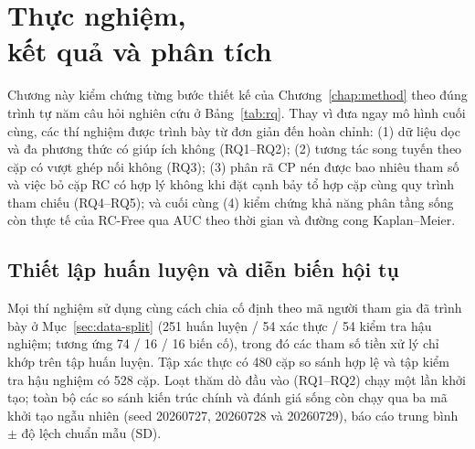 \chapter[Thực nghiệm, kết quả và phân tích]{Thực nghiệm,\\kết quả và phân tích}
\label{chap:results}

Chương này kiểm chứng từng bước thiết kế của Chương~\ref{chap:method} theo đúng trình tự năm câu hỏi nghiên cứu ở Bảng~\ref{tab:rq}. Thay vì đưa ngay mô hình cuối cùng, các thí nghiệm được trình bày từ đơn giản đến hoàn chỉnh: (1) dữ liệu dọc và đa phương thức có giúp ích không (RQ1--RQ2); (2) tương tác song tuyến theo cặp có vượt ghép nối không (RQ3); (3) phân rã CP nén được bao nhiêu tham số và việc bỏ cặp RC có hợp lý không khi đặt cạnh bảy tổ hợp cặp cùng quy trình tham chiếu (RQ4--RQ5); và cuối cùng (4) kiểm chứng khả năng phân tầng sống còn thực tế của RC-Free qua AUC theo thời gian và đường cong Kaplan--Meier.

\section{Thiết lập huấn luyện và diễn biến hội tụ}
\label{sec:experimental-protocol}
Mọi thí nghiệm sử dụng cùng cách chia cố định theo mã người tham gia đã trình bày ở Mục~\ref{sec:data-split} (251 huấn luyện / 54 xác thực / 54 kiểm tra hậu nghiệm; tương ứng 74 / 16 / 16 biến cố), trong đó các tham số tiền xử lý chỉ khớp trên tập huấn luyện. Tập xác thực có 480 cặp so sánh hợp lệ và tập kiểm tra hậu nghiệm có 528 cặp. Loạt thăm dò đầu vào (RQ1--RQ2) chạy một lần khởi tạo; toàn bộ các so sánh kiến trúc chính và đánh giá sống còn chạy qua ba mã khởi tạo ngẫu nhiên (seed 20260727, 20260728 và 20260729), báo cáo trung bình $\pm$ độ lệch chuẩn mẫu (SD).


